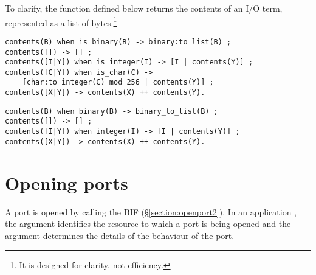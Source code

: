 To clarify, the function  defined below returns the contents
of an I/O term, represented as a list of bytes.\footnote{It is designed for
clarity, not efficiency.}

\ifStd
\begin{verbatim}
contents(B) when is_binary(B) -> binary:to_list(B) ;
contents([]) -> [] ;
contents([I|Y]) when is_integer(I) -> [I | contents(Y)] ;
contents([C|Y]) when is_char(C) ->
    [char:to_integer(C) mod 256 | contents(Y)] ;
contents([X|Y]) -> contents(X) ++ contents(Y).
\end{verbatim}
\fi
\ifOld
\begin{verbatim}
contents(B) when binary(B) -> binary_to_list(B) ;
contents([]) -> [] ;
contents([I|Y]) when integer(I) -> [I | contents(Y)] ;
contents([X|Y]) -> contents(X) ++ contents(Y).
\end{verbatim}
\fi

\section{Opening ports}

\label{section:opening-ports}

A port is opened by calling the BIF
(\S\ref{section:openport2}).
In an application , the 
argument identifies the resource to which a port is being opened and the
 argument determines the details of the behaviour of the port.

